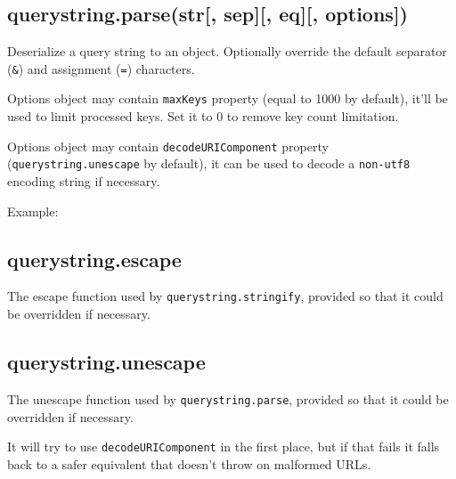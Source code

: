 \subsection{querystring.parse(str{[}, sep{]}{[}, eq{]}{[},
options{]})}\label{querystring.parsestr-sep-eq-options}

Deserialize a query string to an object. Optionally override the default
separator (\texttt{\textquotesingle{}\&\textquotesingle{}}) and
assignment (\texttt{\textquotesingle{}=\textquotesingle{}}) characters.

Options object may contain \texttt{maxKeys} property (equal to 1000 by
default), it'll be used to limit processed keys. Set it to 0 to remove
key count limitation.

Options object may contain \texttt{decodeURIComponent} property
(\texttt{querystring.unescape} by default), it can be used to decode a
\texttt{non-utf8} encoding string if necessary.

Example:

\begin{Shaded}
\end{Shaded}

\subsection{querystring.escape}\label{querystring.escape}

The escape function used by \texttt{querystring.stringify}, provided so
that it could be overridden if necessary.

\subsection{querystring.unescape}\label{querystring.unescape}

The unescape function used by \texttt{querystring.parse}, provided so
that it could be overridden if necessary.

It will try to use \texttt{decodeURIComponent} in the first place, but
if that fails it falls back to a safer equivalent that doesn't throw on
malformed URLs.
